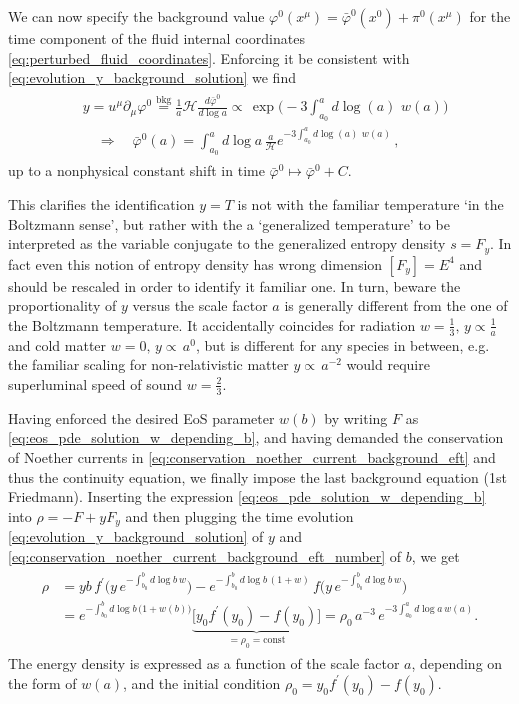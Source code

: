 We can now specify the background value $\varphi^0(x^\mu)=\bar{\varphi}^0(x^0)+\pi^0(x^\mu)$ for the time component of the fluid internal coordinates \eqref{eq:perturbed_fluid_coordinates}.
Enforcing it be consistent with \eqref{eq:evolution_y_background_solution} we find
\begin{align}\label{eq:bkg_scaling_y_coordinate}
\begin{aligned}
    &y=u^\mu\partial_\mu\varphi^0 \overset{\text{bkg}}{=}\tfrac{1}{a}\mathcal{H}\frac{d\bar{\varphi}^0}{d\log\!a}\propto\, \exp\Big(\!\!-\!\!3\!\!\int^a_{a_0}\!\!\!\!\!d\!\log(a)\,\, w(a)\Big)\\[2.5pt]
    &\quad\Rightarrow\quad \bar{\varphi}^0(a)=\int^a_{a_0}\!\!\!d\log\!a\, \frac{a}{\mathcal{H}}e^{-3\int^a_{a_0}\!d\!\log(a)\,\, w(a)}\,,
\end{aligned}\end{align}
up to a nonphysical constant shift in time $\bar{\varphi}^0\mapsto \bar{\varphi}^0 +C$.

This clarifies the identification $y=T$ is not with the familiar temperature `in the Boltzmann sense', but rather with the a `generalized temperature' to be interpreted as the variable conjugate to the generalized entropy density $s=F_y$.
In fact even this notion of entropy density has wrong dimension $[F_y]=E^4$ and should be rescaled in order to identify it familiar one.
In turn, beware the proportionality of $y$ versus the scale factor $a$ is generally different from the one of the Boltzmann temperature.
It accidentally coincides for radiation $w=\tfrac13,\, y\propto \tfrac{1}{a}$ and cold matter $w=0,\,y\propto\, a^0$, but is different for any species in between, e.g. the familiar scaling for non-relativistic matter $y\propto\, a^{-2}$ would require superluminal speed of sound $w=\tfrac23$.

Having enforced the desired EoS parameter $w(b)$ by writing $F$ as \eqref{eq:eos_pde_solution_w_depending_b}, and having demanded the conservation of Noether currents in \eqref{eq:conservation_noether_current_background_eft} and thus the continuity equation, we finally impose the last background equation (1st Friedmann).
Inserting the expression \eqref{eq:eos_pde_solution_w_depending_b} into $\rho=-F+yF_y$ and then plugging the time evolution \eqref{eq:evolution_y_background_solution} of $y$ and \eqref{eq:conservation_noether_current_background_eft_number} of $b$, we get
\begin{align}
\begin{aligned}
    \rho &= yb\, f^\prime\Big(y\, e^{-\int_{b_0}^bd\log\!b\, w}\Big)-e^{-\int_{b_0}^bd\log\!b\, (1+w)}\,f\Big(y\, e^{-\int_{b_0}^bd\log \!b\, w}\Big) \\
    &= e^{-\int_{b_0}^bd\log\!b\, \big(1+w(b)\big)}\underbrace{\Big[y_0f^\prime(y_0)-f(y_0)\Big]}_{=\rho_0=\text{const}} = \rho_0 \, a^{-3}\, e^{-3\int_{a_0}^a\!\!d\log\!a\, w(a)}.
\end{aligned}
\end{align}
The energy density is expressed as a function of the scale factor $a$, depending on the form of $w(a)$, and the initial condition $\rho_0=y_0f^\prime(y_0)-f(y_0)$.

